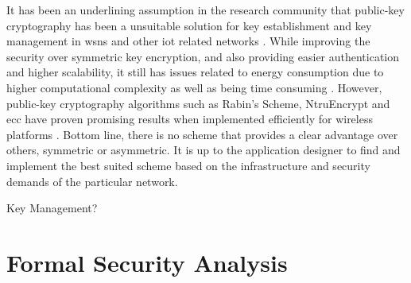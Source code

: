 It has been an underlining assumption in the research community that public-key cryptography has been a unsuitable solution for key establishment and key management in \gls{wsn}s and other \gls{iot} related networks \cite{wander2005energy} \cite{gaubatz2004public}. While improving the security over symmetric key encryption, and also providing easier authentication and higher scalability, it still has issues related to energy consumption due to higher computational complexity as well as being time consuming \citep{Eschenauer2002}. However, public-key cryptography algorithms such as Rabin's Scheme, NtruEncrypt and \gls{ecc} have proven promising results when implemented efficiently for wireless platforms \cite{Jing2014} \cite{gaubatz2004public}. Bottom line, there is no scheme that provides a clear advantage over others, symmetric or asymmetric. It is up to the application designer to find and implement the best suited scheme based on the infrastructure and security demands of the particular network.






Key Management?

\section{Formal Security Analysis} 


